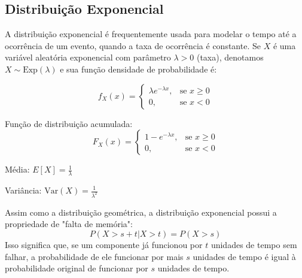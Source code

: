 \documentclass[a4paper,12pt]{article}
\begin{document}
\subsection{Distribuição Exponencial}

A distribuição exponencial é frequentemente usada para modelar o tempo até a ocorrência de um evento, quando a taxa de ocorrência é constante. Se $X$ é uma variável aleatória exponencial com parâmetro $\lambda > 0$ (taxa), denotamos $X \sim \text{Exp}(\lambda)$ e sua função densidade de probabilidade é:

\begin{equation}
f_X(x) = 
\begin{cases}
\lambda e^{-\lambda x}, & \text{se } x \geq 0 \\
0, & \text{se } x < 0
\end{cases}
\end{equation}

Função de distribuição acumulada:
\begin{equation}
F_X(x) = 
\begin{cases}
1 - e^{-\lambda x}, & \text{se } x \geq 0 \\
0, & \text{se } x < 0
\end{cases}
\end{equation}

Média: $E[X] = \frac{1}{\lambda}$

Variância: $\text{Var}(X) = \frac{1}{\lambda^2}$

\begin{tcolorbox}[colback=green!5, colframe=green!40, title=\textbf{Propriedade de "Falta de Memória"}]
Assim como a distribuição geométrica, a distribuição exponencial possui a propriedade de "falta de memória":
\begin{equation}
P(X > s+t | X > t) = P(X > s)
\end{equation}
Isso significa que, se um componente já funcionou por $t$ unidades de tempo sem falhar, a probabilidade de ele funcionar por mais $s$ unidades de tempo é igual à probabilidade original de funcionar por $s$ unidades de tempo.
\end{tcolorbox}
\end{document}
